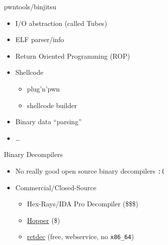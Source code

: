 \begin{frame}
  {pwntools/binjitsu}

  \begin{itemize}
    \item I/O abstraction (called Tubes)
    \item ELF parser/info
    \item Return Oriented Programming (ROP)
    \item Shellcode
      \begin{itemize}
        \item plug'n'pwn
        \item shellcode builder
      \end{itemize}
    \item Binary data ``parsing''
    \item \ldots
  \end{itemize}
\end{frame}


\begin{frame}
  {Binary Decompilers}

  \begin{itemize}
    \item No really good open source binary decompilers \verb+:(+
    \item Commercial/Closed-Source
      \begin{itemize}
        \item Hex-Rays/IDA Pro Decompiler (\$\$\$)
        \item \href{http://hopperapp.com/}{Hopper} (\$)
        \item \href{https://retdec.com/}{retdec} (free, webservice, no \verb+x86_64+)
      \end{itemize}
  \end{itemize}
\end{frame}

